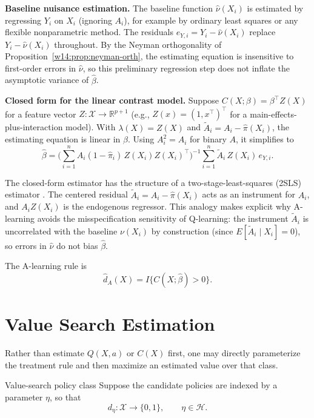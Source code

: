 \documentclass[master.tex]{subfiles}
\begin{document}
\medskip\noindent\textbf{Baseline nuisance estimation.}
The baseline function \(\hat\nu(X_i)\) is estimated by regressing \(Y_i\) on
\(X_i\) (ignoring \(A_i\)), for example by ordinary least squares or any
flexible nonparametric method. The residuals
\(e_{Y,i}=Y_i-\hat\nu(X_i)\) replace \(Y_i-\hat\nu(X_i)\) throughout.
By the Neyman orthogonality of Proposition~\ref{w14:prop:neyman-orth},
the estimating equation is insensitive to first-order errors in
\(\hat\nu\), so this preliminary regression step does not inflate the
asymptotic variance of \(\hat\beta\).

\medskip\noindent\textbf{Closed form for the linear contrast model.}
Suppose \(C(X;\beta)=\beta^\top Z(X)\) for a feature vector
\(Z:\mathcal X\to\mathbb R^{p+1}\) (e.g., \(Z(x)=(1,x^\top)^\top\) for a
main-effects-plus-interaction model). With \(\lambda(X)=Z(X)\) and
\(\tilde A_i=A_i-\hat\pi(X_i)\), the estimating equation is linear in \(\beta\).
Using \(A_i^2=A_i\) for binary \(A\), it simplifies to
\[
\hat\beta
=\Biggl(\sum_{i=1}^n A_i(1-\hat\pi_i)\,Z(X_i)Z(X_i)^\top\Biggr)^{-1}
 \sum_{i=1}^n \tilde A_i\,Z(X_i)\,e_{Y,i}.
\]

\begin{remark}
The closed-form estimator has the structure of a two-stage-least-squares
(2SLS) estimator \citep{robins2004optimal}. The centered residual
\(\tilde A_i=A_i-\hat\pi(X_i)\) acts as an instrument for \(A_i\), and
\(A_i Z(X_i)\) is the endogenous regressor. This analogy makes explicit
why A-learning avoids the misspecification sensitivity of Q-learning:
the instrument \(\tilde A_i\) is uncorrelated with the baseline
\(\nu(X_i)\) by construction (since \(E[\tilde A_i\mid X_i]=0\)), so
errors in \(\hat\nu\) do not bias \(\hat\beta\).
\end{remark}

The A-learning rule is
\[
\hat d_A(X)=I\bigl\{C(X;\hat\beta)>0\bigr\}.
\]

\section{Value Search Estimation}
\label{w14:sec:valuesearch}

Rather than estimate \(Q(X,a)\) or \(C(X)\) first, one may directly parameterize the treatment rule and then maximize an estimated value over that class.

\begin{defn}{Value-search policy class}
\label{w14:defn:valueclass}
Suppose the candidate policies are indexed by a parameter \(\eta\), so that
\[
d_\eta:\mathcal X\to\{0,1\}, \qquad \eta\in\mathcal H.
\]
\end{defn}
\end{document}
